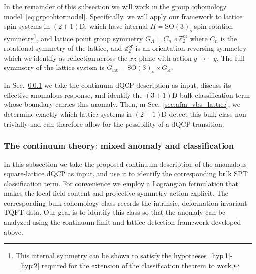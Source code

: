 \documentclass[aps,prx,reprint,superscriptaddress,twocolumn,amsmath,amssymb,amsfonts, nofootinbib]{revtex4-2}
\newcommand{\SO}{\text{SO}}
\newcommand{\Z}{\mathbb{Z}}
\theoremstyle{apsstyle}
\begin{document}
\bigskip 

In the remainder of this subsection we will work in the group cohomology model~\eqref{eq:grpcohtormodel}. Specifically, we will apply our framework to lattice spin systems in $(2+1)$D, which have internal $H=\SO(3)_{\mathrm{s}}$-spin rotation symmetry\footnote{This internal symmetry can be shown to satisfy the hypotheses~\ref{hyp:1}-~\ref{hyp:2} required for the extension of the classification theorem to work.}, and lattice point group symmetry $G_{\Lambda}=C_{n}\rtimes \Z_{2}^{\mathrm{or}}$ where $C_{n}$ is the rotational symmetry of the lattice, and $\Z_{2}^{\mathrm{or}}$ is an orientation reversing symmetry which we identify as reflection across the $xz$-plane with action $y\to-y$. The full symmetry of the lattice system is $G_{\mathrm{lat}}=\SO(3)_{\mathrm{s}}\times G_{\Lambda}$. 

In Sec.~\ref{sec:afm_vbs_cont} we take the continuum dQCP description as input, discuss its effective anomalous response, and identify the $(3+1)$D bulk classification term whose boundary carries this anomaly. Then, in Sec.~\ref{sec:afm_vbs_lattice}, we determine exactly which lattice systems in $(2+1)$D detect this bulk class non-trivially and can therefore allow for the possibility of a dQCP transition.

\subsubsection{The continuum theory: mixed anomaly and classification}
\label{sec:afm_vbs_cont}
In this subsection we take the proposed continuum description of the anomalous square-lattice dQCP as input, and use it to identify the corresponding bulk SPT classification term. For convenience we employ a Lagrangian formulation that makes the local field content and projective symmetry action explicit. The corresponding bulk cohomology class records the intrinsic, deformation-invariant TQFT data. Our goal is to identify this class so that the anomaly can be analyzed using the continuum-limit and lattice-detection framework developed above.
\end{document}
